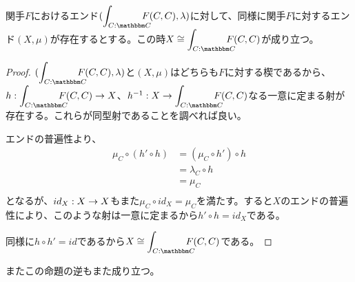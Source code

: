   \begin{prop}[エンドの一意性]
    関手$F$におけるエンド$(\cend{C}{C}F(C,C),\lambda)$に対して、同様に関手$F$に対するエンド$(X,\mu)$が存在するとする。この時$X\cong\cend{C}{C}F(C,C)$が成り立つ。
  \end{prop}
  \begin{proof}
    $(\cend{C}{C}F(C,C),\lambda)$と$(X,\mu)$はどちらも$F$に対する楔であるから、$\mor{h}{\cend{C}{C}F(C,C)}{X}$、$\mor{h^{-1}}{X}{\cend{C}{C}F(C,C)}$なる一意に定まる射が存在する。これらが同型射であることを調べれば良い。

    エンドの普遍性より、
    \begin{align*}
      \mu_C\circ(h'\circ h) &=(\mu_C\circ h')\circ h\\
      &= \lambda_C \circ h\\
      &=\mu_C\\
    \end{align*}
    となるが、$id_X:X\rightarrow X$もまた$\mu_C\circ id_X = \mu_C$を満たす。すると$X$のエンドの普遍性により、このような射は一意に定まるから$h'\circ h=id_X$である。
    \begin{center}
    \end{center}
    同様に$h\circ h'=id$であるから$X\cong\cend{C}{C}F(C,C)$である。
  \end{proof}
  またこの命題の逆もまた成り立つ。
  
